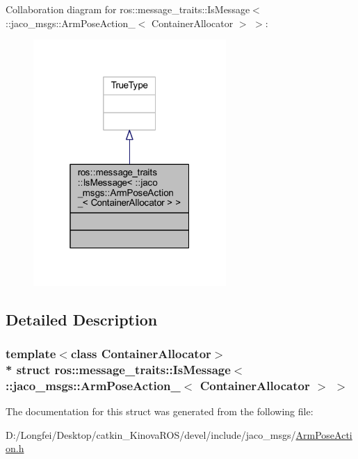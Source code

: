 Collaboration diagram for ros\+:\+:message\+\_\+traits\+:\+:Is\+Message$<$ \+:\+:jaco\+\_\+msgs\+:\+:Arm\+Pose\+Action\+\_\+$<$ Container\+Allocator $>$ $>$\+:
\nopagebreak
\begin{figure}[H]
\begin{center}
\leavevmode
\includegraphics[width=208pt]{d7/df7/structros_1_1message__traits_1_1IsMessage_3_01_1_1jaco__msgs_1_1ArmPoseAction___3_01ContainerAllocator_01_4_01_4__coll__graph}
\end{center}
\end{figure}


\subsection{Detailed Description}
\subsubsection*{template$<$class Container\+Allocator$>$\\*
struct ros\+::message\+\_\+traits\+::\+Is\+Message$<$ \+::jaco\+\_\+msgs\+::\+Arm\+Pose\+Action\+\_\+$<$ Container\+Allocator $>$ $>$}



The documentation for this struct was generated from the following file\+:\begin{DoxyCompactItemize}
\item 
D\+:/\+Longfei/\+Desktop/catkin\+\_\+\+Kinova\+R\+O\+S/devel/include/jaco\+\_\+msgs/\hyperlink{ArmPoseAction_8h}{Arm\+Pose\+Action.\+h}\end{DoxyCompactItemize}
